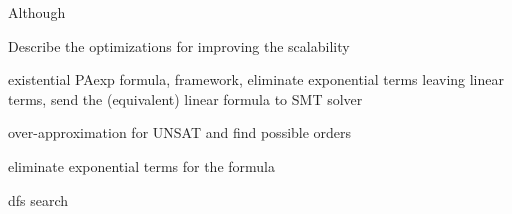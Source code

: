 
Although

Describe the optimizations for improving the scalability

existential PAexp formula, framework, eliminate exponential terms leaving linear terms, send the (equivalent) linear formula to SMT solver

over-approximation for UNSAT and find possible orders

eliminate exponential terms for the formula

dfs search




